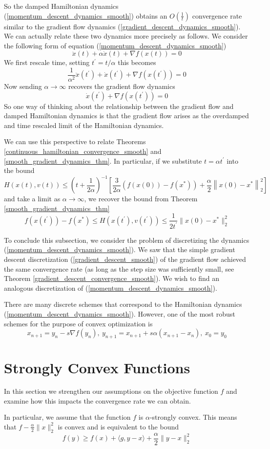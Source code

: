 So the damped Hamiltonian dynamics (\ref{momentum_descent_dynamics_smooth}) obtains an $O(\frac{1}{t})$ convergence rate
similar to the gradient flow dynamics (\ref{gradient_descent_dynamics_smooth}). We can actually relate these two dynamics more 
precisely as follows. We consider the following form of equation (\ref{momentum_descent_dynamics_smooth})
$$ \ddot{x}(t) + \alpha \dot{x}(t) + \nabla f(x(t)) = 0
$$
We first rescale time, setting $t^\prime = t / \alpha$ this becomes
$$ \frac{1}{\alpha^2}\ddot{x}(t^\prime) + \dot{x}(t^\prime) + \nabla f(x(t^\prime)) = 0
$$
Now sending $\alpha\rightarrow \infty$ recovers the gradient flow dynamics
$$\dot{x}(t^\prime) + \nabla f(x(t^\prime)) = 0
$$
So one way of thinking about the relationship between the gradient flow and damped Hamiltonian dynamics is that the
gradient flow arises as the overdamped and time rescaled limit of the Hamiltonian dynamics. 

We can use this perspective to
relate Theorems \ref{continuous_hamiltonian_convergence_smooth} and \ref{smooth_gradient_dynamics_thm}. In particular,
if we substitute $t = \alpha t^\prime$ into the bound
$$H(x(t),v(t)) \leq \left(t + \frac{1}{2\alpha}\right)^{-1}\left[\frac{3}{2\alpha}(f(x(0)) - f(x^*)) + \frac{\alpha}{2}\left\|x(0) - x^*\right\|_2^2\right]
$$
and take a limit as $\alpha\rightarrow \infty$, we recover the bound from Theorem \ref{smooth_gradient_dynamics_thm}
$$f(x(t^\prime)) - f(x^*) \leq H(x(t^\prime),v(t^\prime)) \leq \frac{1}{2t^\prime}\|x(0) - x^*\|_2^2
$$

To conclude this subsection, we consider the problem of discretizing the dynamics (\ref{momentum_descent_dynamics_smooth}).
We saw that the simple gradient descent discretization (\ref{gradient_descent_smooth}) of the gradient flow achieved
the same convergence rate
(as long as the step size was sufficiently small, see Theorem \ref{gradient_descent_convergence_smooth}). 
We wish to find an analogous discretization
of (\ref{momentum_descent_dynamics_smooth}).

There are many discrete schemes that correspond to the Hamiltonian dynamics (\ref{momentum_descent_dynamics_smooth}). However,
one of the most robust schemes for the purpose of convex optimization is
\begin{equation}\label{momentum_gradient_descent_smooth}
 x_{n+1} = y_n - s\nabla f(y_n),~y_{n+1} = x_{n+1} + s\alpha (x_{n+1} - x_n),~x_0 = y_0
\end{equation}

\section{Strongly Convex Functions}
In this section we strengthen our assumptions on the objective function $f$ and examine how this impacts the convergence rate we
can obtain. 

In particular, we assume that the function $f$ is $\alpha$-strongly convex. This means that 
$f - \frac{\alpha}{2}\|x\|_2^2$ is convex and is equivalent to the bound
\begin{equation}
 f(y) \geq f(x) + \langle g, y - x\rangle + \frac{\alpha}{2}\|y-x\|_2^2
\end{equation}



